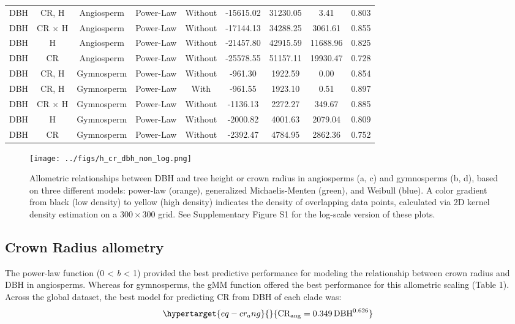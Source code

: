 \documentclass[
  12pt,
  letterpaper,
  DIV=11,
  numbers=noendperiod]{scrartcl}
\begin{document}
\begin{longtable*}[t]{ccccccccc}
DBH & CR, H & Angiosperm & Power-Law & Without & -15615.02 & 31230.05 & 3.41 & 0.803\\
DBH & CR × H & Angiosperm & Power-Law & Without & -17144.13 & 34288.25 & 3061.61 & 0.855\\
DBH & H & Angiosperm & Power-Law & Without & -21457.80 & 42915.59 & 11688.96 & 0.825\\
\addlinespace
DBH & CR & Angiosperm & Power-Law & Without & -25578.55 & 51157.11 & 19930.47 & 0.728\\
DBH & CR, H & Gymnosperm & Power-Law & Without & -961.30 & 1922.59 & 0.00 & 0.854\\
DBH & CR, H & Gymnosperm & Power-Law & With & -961.55 & 1923.10 & 0.51 & 0.897\\
DBH & CR × H & Gymnosperm & Power-Law & Without & -1136.13 & 2272.27 & 349.67 & 0.885\\
DBH & H & Gymnosperm & Power-Law & Without & -2000.82 & 4001.63 & 2079.04 & 0.809\\
\addlinespace
DBH & CR & Gymnosperm & Power-Law & Without & -2392.47 & 4784.95 & 2862.36 & 0.752\\
\bottomrule
\end{longtable*}
\endgroup{}

\newpage

\begin{figure}

{\centering \texttt{[image: ../figs/h\_cr\_dbh\_non\_log.png]}

}

\caption{\label{fig-compare}Allometric relationships between DBH and
tree height or crown radius in angiosperms (a, c) and gymnosperms (b,
d), based on three different models: power-law (orange), generalized
Michaelis-Menten (green), and Weibull (blue). A color gradient from
black (low density) to yellow (high density) indicates the density of
overlapping data points, calculated via 2D kernel density estimation on
a 300\,\(\times\)\,300 grid. See Supplementary Figure S1 for the
log-scale version of these plots.}

\end{figure}

\hypertarget{crown-radius-allometry}{%
\subsection{Crown Radius allometry}\label{crown-radius-allometry}}

The power-law function (0 \textless{} \emph{b} \textless{} 1) provided
the best predictive performance for modeling the relationship between
crown radius and DBH in angiosperms. Whereas for gymnosperms, the gMM
function offered the best performance for this allometric scaling (Table
1). Across the global dataset, the best model for predicting CR from DBH
of each clade was: \begin{equation}\protect\hypertarget{eq-cr_ang}{}{
\mathrm{CR_{ang}} = \mathrm{0.349}
\, \mathrm{DBH}^{\mathrm{0.626}}
}\label{eq-cr_ang}\end{equation}
\end{document}
